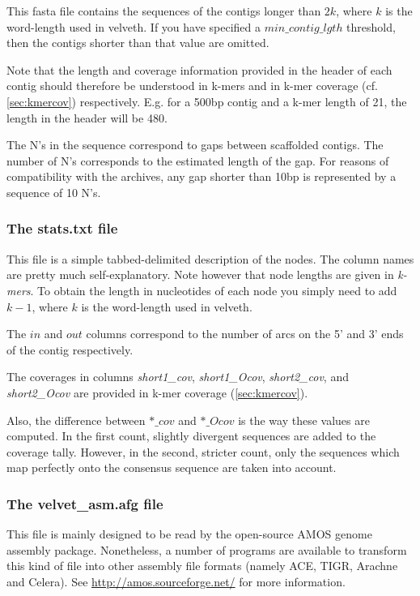 \documentclass{article}
\begin{document}
\label{sec:fasta}

This fasta file contains the sequences of the contigs longer than $2k$, where $k$ is the word-length used in velveth. If you have specified a $min\_contig\_lgth$ threshold, then the contigs shorter than that value are omitted.

Note that the length and coverage information provided in the header of each contig should therefore be understood in k-mers and in k-mer coverage (cf. \ref{sec:kmercov}) respectively. E.g. for a 500bp contig and a k-mer length of 21, the length in the header will be 480.

The N's in the sequence correspond to gaps between scaffolded contigs. The number of N's corresponds to the estimated length of the gap. For reasons of compatibility with the archives, any gap shorter than 10bp is represented by a sequence of 10 N's.

\subsubsection{The stats.txt file}

\label{sec:stats}

This file is a simple tabbed-delimited description of the nodes. The column names are pretty much self-explanatory. Note however that node lengths are given in \emph{k-mers}. To obtain the length in nucleotides of each node you simply need to add $k-1$, where $k$ is the word-length used in velveth.

The $in$ and $out$ columns correspond to the number of arcs on the 5' and 3' ends of the contig respectively.

The coverages in columns \emph{short1\_cov}, \emph{short1\_Ocov}, \emph{short2\_cov}, and \emph{short2\_Ocov} are provided in k-mer coverage (\ref{sec:kmercov}).

Also, the difference between $*\_cov$ and $*\_Ocov$ is the way these values are computed. In the first count, slightly divergent sequences are added to the coverage tally. However, in the second, stricter count, only the sequences which map perfectly onto the consensus sequence are taken into account.

\subsubsection{The velvet\_asm.afg file}

\label{sec:amos}

This file is mainly designed to be read by the open-source AMOS genome assembly package. Nonetheless, a number of programs are available to transform this kind of file into other assembly file formats (namely ACE, TIGR, Arachne and Celera). See \href{http://amos.sourceforge.net/}{http://amos.sourceforge.net/} for more information.
\end{document}
